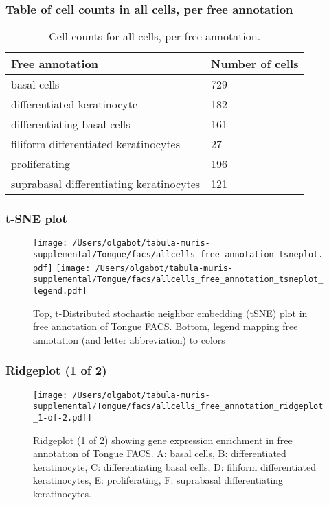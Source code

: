 \subsubsection{Table of cell counts in all cells, per free annotation}\begin{table}[h]
\centering
\label{my-label}
\begin{tabular}{@{}ll@{}}
\toprule

Free annotation& Number of cells \\ \midrule
basal cells & 729 \\

differentiated keratinocyte & 182 \\

differentiating basal cells & 161 \\

filiform differentiated keratinocytes & 27 \\

proliferating & 196 \\

suprabasal differentiating keratinocytes & 121 \\
\bottomrule
\end{tabular}
\caption{Cell counts for all cells, per free annotation.}
\end{table}

\clearpage
\subsubsection{t-SNE plot}
\begin{figure}[h]
\centering
\texttt{[image: /Users/olgabot/tabula-muris-supplemental/Tongue/facs/allcells\_free\_annotation\_tsneplot.pdf]}
\texttt{[image: /Users/olgabot/tabula-muris-supplemental/Tongue/facs/allcells\_free\_annotation\_tsneplot\_legend.pdf]}
\caption{Top, t-Distributed stochastic neighbor embedding (tSNE) plot  in free annotation of Tongue FACS. Bottom, legend mapping free annotation (and letter abbreviation) to colors}
\end{figure}


\clearpage
\clearpage
\subsubsection{Ridgeplot (1 of 2)}
\begin{figure}[h]
\centering
\texttt{[image: /Users/olgabot/tabula-muris-supplemental/Tongue/facs/allcells\_free\_annotation\_ridgeplot\_1-of-2.pdf]}

\caption{ Ridgeplot (1 of 2)  showing gene expression enrichment in free annotation of Tongue FACS. A: basal cells, B: differentiated keratinocyte, C: differentiating basal cells, D: filiform differentiated keratinocytes, E: proliferating, F: suprabasal differentiating keratinocytes.}
\end{figure}


